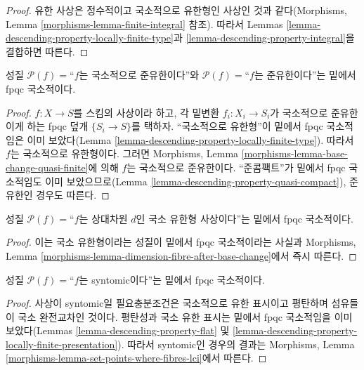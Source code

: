 \begin{proof}
유한 사상은 정수적이고 국소적으로 유한형인 사상인 것과 같다(Morphisms,
Lemma \ref{morphisms-lemma-finite-integral} 참조). 따라서 Lemmas
\ref{lemma-descending-property-locally-finite-type}과
\ref{lemma-descending-property-integral}을 결합하면 따른다.
\end{proof}

\begin{lemma}
\label{lemma-descending-property-quasi-finite}
성질 $\mathcal{P}(f) =$“$f$는 국소적으로 준유한이다”와
$\mathcal{P}(f) =$“$f$는 준유한이다”는 밑에서 fpqc 국소적이다.
\end{lemma}

\begin{proof}
$f : X \to S$를 스킴의 사상이라 하고, 각 밑변환
$f_i : X_i \to S_i$가 국소적으로 준유한이게 하는 fpqc 덮개
$\{S_i \to S\}$를 택하자. “국소적으로 유한형”이 밑에서 fpqc
국소적임은 이미 보았다(Lemma
\ref{lemma-descending-property-locally-finite-type}). 따라서 $f$는
국소적으로 유한형이다. 그러면 Morphisms, Lemma
\ref{morphisms-lemma-base-change-quasi-finite}에 의해 $f$는 국소적으로
준유한이다. “준콤팩트”가 밑에서 fpqc 국소적임도 이미 보았으므로(Lemma
\ref{lemma-descending-property-quasi-compact}), 준유한인 경우도 따른다.
\end{proof}

\begin{lemma}
\label{lemma-descending-property-relative-dimension-d}
성질 $\mathcal{P}(f) =$“$f$는 상대차원 $d$인 국소 유한형 사상이다”는
밑에서 fpqc 국소적이다.
\end{lemma}

\begin{proof}
이는 국소 유한형이라는 성질이 밑에서 fpqc 국소적이라는 사실과
Morphisms, Lemma
\ref{morphisms-lemma-dimension-fibre-after-base-change}에서 즉시 따른다.
\end{proof}

\begin{lemma}
\label{lemma-descending-property-syntomic}
성질 $\mathcal{P}(f) =$“$f$는 syntomic이다”는 밑에서 fpqc 국소적이다.
\end{lemma}

\begin{proof}
사상이 syntomic일 필요충분조건은 국소적으로 유한 표시이고 평탄하며
섬유들이 국소 완전교차인 것이다. 평탄성과 국소 유한 표시는 밑에서 fpqc
국소적임을 이미 보았다(Lemmas \ref{lemma-descending-property-flat} 및
\ref{lemma-descending-property-locally-finite-presentation}). 따라서
syntomic인 경우의 결과는 Morphisms, Lemma
\ref{morphisms-lemma-set-points-where-fibres-lci}에서 따른다.
\end{proof}

